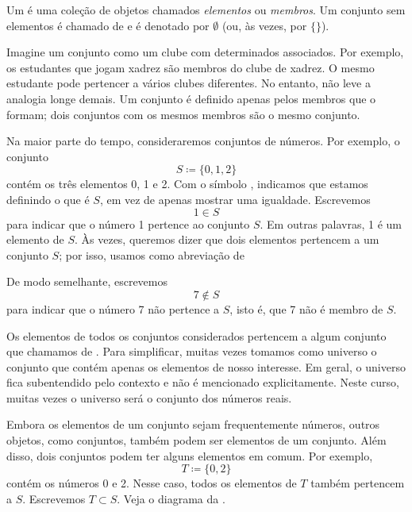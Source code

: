 \begin{defn}
Um \emph{} é uma coleção de objetos chamados
\emph{elementos} ou \emph{membros}. Um conjunto
sem elementos é chamado de \emph{} e é denotado por
$\emptyset$ (ou, às vezes, por $\{ \}$).
\end{defn}

Imagine um conjunto como um clube com determinados associados. Por exemplo,
os estudantes que jogam xadrez são membros do clube de xadrez.
O mesmo estudante pode pertencer a vários clubes diferentes.
No entanto, não leve a analogia longe demais. Um conjunto é definido apenas
pelos membros que o formam; dois conjuntos com os mesmos membros são o mesmo
conjunto.

Na maior parte do tempo, consideraremos conjuntos de números. Por exemplo, o
conjunto
\begin{equation*}
S \coloneqq \{ 0, 1, 2 \}
\end{equation*}
contém os três elementos 0, 1 e 2.
Com o símbolo \myquote{$\coloneqq$}, indicamos que estamos
definindo o que é $S$, em vez de apenas mostrar uma igualdade.
Escrevemos
\begin{equation*}
1 \in S
\end{equation*}
para indicar que o número 1 pertence ao conjunto $S$. Em outras palavras, 1
é um elemento de $S$.
Às vezes, queremos dizer que dois elementos pertencem a um conjunto $S$; por
isso, usamos  como abreviação de

De modo semelhante, escrevemos
\begin{equation*}
7 \notin S
\end{equation*}
para indicar que o número 7 não pertence a $S$, isto é, que 7 não é membro
de $S$.

Os elementos de todos os conjuntos considerados pertencem a algum conjunto
que chamamos de \emph{}. Para simplificar, muitas vezes
tomamos como universo o conjunto que contém apenas os elementos de nosso
interesse.
Em geral, o universo fica subentendido pelo contexto e não é mencionado
explicitamente. Neste curso, muitas vezes o universo será o conjunto dos
números reais.

Embora os elementos de um conjunto sejam frequentemente números, outros
objetos, como conjuntos, também podem ser elementos de um conjunto.
Além disso, dois conjuntos podem ter alguns elementos em comum. Por exemplo,
\begin{equation*}
T \coloneqq \{ 0, 2 \}
\end{equation*}
contém os números 0 e 2. Nesse caso, todos os elementos de $T$ também
pertencem a $S$. Escrevemos $T \subset S$.
Veja o diagrama da .

